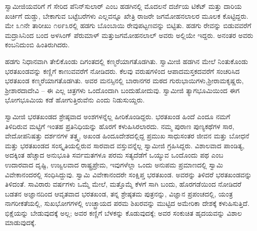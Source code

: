  ಸ್ವಾಮೀಜಿಯವರಿಗೆ  ಗೆ ಸೇರಿದ ಪೆನಿನ್​ಸುಲಾರ್ ಎಂಬ ಹಡಗಿನಲ್ಲಿ ಮೊದಲನೆ ದರ್ಜೆಯ ಟಿಕೆಟ್ ಮತ್ತು ದಾರಿಯ ಖರ್ಚಿಗೆ ದುಡ್ಡು, ಬೇಕಾಗುವ ಬಟ್ಟೆಬರೆಗಳು ಎಲ್ಲವನ್ನೂ ಖೇತ್ರಿ ರಾಜರೇ ಜಗಮೋಹನಲಾಲರ ಮೂಲಕ ಕೊಟ್ಟಿದ್ದರು. ಮೇ ೩೧ನೇ ತಾರೀಖು ೧೮೯೩ರಲ್ಲಿ ಹಡಗು ಬೊಂಬಾಯಿ ರೇವುಪಟ್ಟಣವನ್ನು ಬಿಟ್ಟಿತು. ಹಡಗು ರೇವನ್ನು ಬಿಡುವವರೆಗೆ ಮದ್ರಾಸಿನಿಂದ ಬಂದ ಅಳಸಿಂಗ್ ಪೆರುಮಾಳ್ ಮತ್ತು\break ಜಗಮೋಹನಲಾಲ್ ಅವರು ಅಲ್ಲಿಯೇ ಇದ್ದರು. ಅನಂತರ ಅವರು ಕಂಬನಿದುಂಬಿ ಹಿಂತಿರುಗಿದರು. 

 ಹಡಗು ನಿಧಾನವಾಗಿ ತೇಲಿಕೊಂಡು ದಿಗಂತದಲ್ಲಿ ಕಣ್ಮರೆಯಾಗತೊಡಗಿತು. ಸ್ವಾಮೀಜಿ ಹಡಗಿನ ಮೇಲೆ ನಿಂತುಕೊಂಡು ಭರತಖಂಡವನ್ನು ಕಣ್ಣಿಗೆ ಕಾಣುವವರೆಗೆ ನೋಡಿದರು. ಕೆಲವು ವರುಷಗಳಿಂದ ಆಪಾದಮಸ್ತಕದವರೆಗೆ ಸಂಚರಿಸಿದ ಭರತಖಂಡ ಕಣ್ಮರೆಯಾಗತೊಡಗಿತು. ಅವರ ಮನಸ್ಸಿನಲ್ಲಿ ಬಾರಾನಗರ ಮಠದ ಗುರುಭಾಯಿಗಳು,\break ಶ‍್ರೀರಾಮಕೃಷ್ಣರು, ಶ‍್ರೀಶಾರದಾದೇವಿ – ಈ ಎಲ್ಲ ಚಿತ್ರಗಳು ಒಂದೊಂದಾಗಿ ಬಂದುಹೋದುವು. ಸ್ವಾಮೀಜಿ ತ್ಯಾಗಭೂಮಿಯಿಂದ ಈಗ ಭೋಗಭೂಮಿಯ ಕಡೆ ಹೋಗುತ್ತಿರುವೆನು ಎಂದು ನಿಡುಸುಯ್ದರು. 

 ಸ್ವಾಮೀಜಿ ಭರತಖಂಡದ ಶ್ರೇಷ್ಠವಾದ ಅಂಶಗಳನ್ನೆಲ್ಲ ಹೀರಿಕೊಂಡಿದ್ದರು. ಭರತಖಂಡ ಹಿಂದೆ ಎಂದೂ ನಮಗೆ ತಿಳಿದಿರುವ ಮಟ್ಟಿಗೆ ಇಂತಹ ಪ್ರತಿನಿಧಿಯನ್ನು ಹೊರಗೆ ಕಳುಹಿಸಿರಲಾರದು. ನಮ್ಮ ಪುರಾಣ ಪುಣ್ಯಕಥೆಗಳ ಸಾರ, ವೇದೋಪನಿಷತ್ತು ದರ್ಶನಗಳ ತತ್ತ್ವ, ಅಖಂಡ ಹಿಂದೂದೇಶದಲ್ಲಿದ್ದ ಪ್ರಮುಖ ಸಾಧುಸಂತರ ಜೀವನ ಮತ್ತು ಬೋಧನೆ ಮತ್ತು ಭರತಖಂಡದ ಸಂಸ್ಕೃತಿಯಲ್ಲಿರುವ ಸಾರವಾದ ವಸ್ತುವನ್ನೆಲ್ಲ ಸ್ವಾಮೀಜಿ ಗ್ರಹಿಸಿದ್ದರು. ವಿಶಾಲವಾದ ಪಾಂಡಿತ್ಯ, ಅದಕ್ಕಿಂತ ಹೆಚ್ಚಾದ ಅನುಭೂತಿ ಸರ್ವಮತಗಳೂ ಪರಮ ಸತ್ಯದೆಡೆಗೆ ಒಯ್ಯುವ ಒಂದೊಂದು ಪಥ ಎಂಬ ಉದಾರವಾದ ದೃಷ್ಟಿ, ಉಜ್ವಲವಾದ ರಾಷ್ಟ್ರಪ್ರೇಮ, ಇವುಗಳೆಲ್ಲಾ ಒಂದು ಅನುಪಮ ಪ್ರಮಾಣದಲ್ಲಿ ಸ್ವಾಮಿ ವಿವೇಕಾನಂದರಲ್ಲಿ ಸಂಧಿಸಿದ್ದುವು. ಸ್ವಾಮಿ ವಿವೇಕಾನಂದರೇ ಸಂಕ್ಷಿಪ್ತ ಭರತಖಂಡ. ಅವರನ್ನು ತಿಳಿದರೆ ಭರತಖಂಡವನ್ನು ತಿಳಿದಂತೆ. ಸಾವಿರಾರು ವರ್ಷಗಳು ಒಮ್ಮೆ ಮೇಲೆ, ಮತ್ತೊಮ್ಮೆ ಕೆಳಗೆ ಸಾಗಿ ಬಂದು, ಹೊರಗಡೆಯಿಂದ ನೋಡಿದರೆ ಬಡತನ ಅಜ್ಞಾನದಿಂದ ಆವೃತವಾದ ಭರತಖಂಡ, ತನ್ನ ಶ್ರೇಷ್ಠತಮ ಪುತ್ರನನ್ನು, ವಿಜ್ಞಾನ ಪ್ರಪಂಚದಲ್ಲಿ, ಯಂತ್ರ ನಾಗರೀಕತೆಯಲ್ಲಿ, ಸುಖಭೋಗಗಳಲ್ಲಿ ಉಚ್ಛ್ರಾಯದ ಪರಮ ಶಿಖರವನ್ನು ಮುಟ್ಟಿದ ಅಮೇರಿಕಾ ದೇಶಕ್ಕೆ ಕಳುಹಿಸುತ್ತಿದೆ. ಭಿಕ್ಷೆಯನ್ನು ಬೇಡುವುದಕ್ಕೆ ಅಲ್ಲ; ಅವರ ಕಣ್ಣಿಗೆ ಬೆಳಕನ್ನು ಕೊಡುವುದಕ್ಕೆ; ಅವರ ಸಂಕುಚಿತ ಹೃದಯವನ್ನು ವಿಶಾಲ ಮಾಡುವುದಕ್ಕೆ. 

